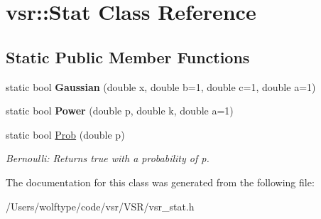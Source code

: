 \hypertarget{classvsr_1_1_stat}{\section{vsr\-:\-:Stat Class Reference}
\label{classvsr_1_1_stat}
}
\subsection*{Static Public Member Functions}
\begin{DoxyCompactItemize}
\item 
\hypertarget{classvsr_1_1_stat_a054a83b78bb7abb6a55ee9eebbe98e3e}{static bool {\bfseries Gaussian} (double x, double b=1, double c=1, double a=1)}\label{classvsr_1_1_stat_a054a83b78bb7abb6a55ee9eebbe98e3e}

\item 
\hypertarget{classvsr_1_1_stat_aef53f8c8ad39b6d180132ecc4cc45329}{static bool {\bfseries Power} (double p, double k, double a=1)}\label{classvsr_1_1_stat_aef53f8c8ad39b6d180132ecc4cc45329}

\item 
\hypertarget{classvsr_1_1_stat_a19090c755b4a2cf13c9b9f47c4927045}{static bool \hyperlink{classvsr_1_1_stat_a19090c755b4a2cf13c9b9f47c4927045}{Prob} (double p)}\label{classvsr_1_1_stat_a19090c755b4a2cf13c9b9f47c4927045}

\begin{DoxyCompactList}\small\item\em Bernoulli\-: Returns true with a probability of p. \end{DoxyCompactList}\end{DoxyCompactItemize}


The documentation for this class was generated from the following file\-:\begin{DoxyCompactItemize}
\item 
/\-Users/wolftype/code/vsr/\-V\-S\-R/vsr\-\_\-stat.\-h\end{DoxyCompactItemize}
